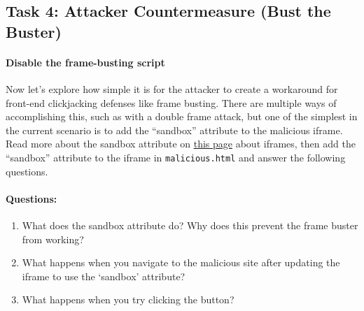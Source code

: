 
\subsection{Task 4: Attacker Countermeasure (Bust the Buster)}

\paragraph{Disable the frame-busting script}
Now let's explore how simple it is for the attacker to create a
workaround for front-end clickjacking defenses like frame busting. There
are multiple ways of accomplishing this, such as with a double frame
attack, but one of the simplest in the current scenario is to add the
``sandbox'' attribute to the malicious iframe. Read more about the
sandbox attribute on
\underline{\href{https://developer.mozilla.org/en-US/docs/Web/HTML/Element/iframe}{this
page}} about iframes, then add the ``sandbox'' attribute to the iframe
in \texttt{malicious.html} and answer the following questions.  



\paragraph{Questions:}
\begin{enumerate}
    \item What does the sandbox attribute do? Why does this prevent the frame buster from working?
    \item What happens when you navigate to the malicious site after
updating the iframe to use the `sandbox' attribute?
    \item What happens when you try clicking the button?
\end{enumerate}


